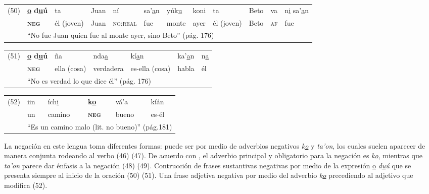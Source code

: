 {%
{\small
\noindent \begin{tabular}{llllllllllll}
 (50) & \textbf{\underline{o} d\underline{u}ú} & ta & Juan & ní & sa'\underline{a}n & yúk\underline{u} & koni & ta & Beto & va & n\underline{i} sa'\underline{a}n \\
 & \textsc{\textbf{neg}} & él (joven) & Juan & \textsc{no:real} & fue & monte & ayer & él (joven) & Beto & \textsc{af} & fue \\
 & \multicolumn{11}{l}{``No fue Juan quien fue al monte ayer, sino Beto'' (pág. 176)}
\end{tabular} \vspace{0.2cm}
}

\noindent \begin{tabular}{lllllll}
(51) & \textbf{\underline{o} d\underline{u}ú} & ña & nda\underline{a} & kí\underline{a}n & ka'\underline{a}n & n\underline{a} \\
& \textsc{\textbf{neg}} & ella (cosa) & verdadera & es-ella (cosa) & habla & él \\
& \multicolumn{6}{l}{``No es verdad lo que dice él'' (pág. 176)}
\end{tabular} \vspace{0.2cm}

\noindent \begin{tabular}{llllll}
(52) & iin & ích\underline{i} & \textbf{k\underline{o}} & vá'a & kíán \\
& un & camino & \textsc{\textbf{neg}} & bueno & es-él \\
& \multicolumn{5}{l}{``Es un camino malo (lit. no bueno)'' (pág.181)}
\end{tabular} \vspace{0.25cm}

}

La negación en este lengua toma diferentes formas: puede ser por medio de adverbios negativos {\setmainfont{Charis SIL} \textit{k\underline{o}} y \textit{ta'on}}, los cuales suelen aparecer de manera conjunta rodeando al verbo (46) (47). De acuerdo con \textcolor{MidnightBlue}{\citet{Mixteco}}, el adverbio principal y obligatorio para la negación es {\setmainfont{Charis SIL} \textit{k\underline{o}}}, mientras que {\setmainfont{Charis SIL} \textit{ta'on}} parece dar énfasis a la negación (48) (49). Contrucción de frases sustantivas negativas por medio de la expresión {\setmainfont{Charis SIL} \underline{o} \textit{d\underline{u}ú}} que se presenta siempre al inicio de la oración (50) (51). Una frase adjetiva negativa por medio del adverbio {\setmainfont{Charis SIL} \textit{k\underline{o}}} precediendo al adjetivo que modifica (52).